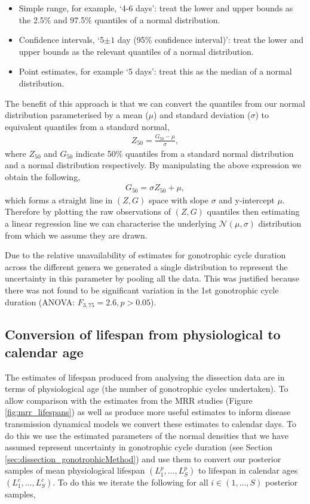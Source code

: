 \documentclass[12pt]{article}
\begin{document}
{\begin{itemize}
	\item Simple range, for example, `4-6 days': treat the lower and upper bounds as the 2.5\% and 97.5\% quantiles of a normal distribution.
	\item Confidence intervals, `5$\pm 1$ day (95\% confidence interval)': treat the lower and upper bounds as the relevant quantiles of a normal distribution.
	\item Point estimates, for example `5 days': treat this as the median of a normal distribution.
\end{itemize}

The benefit of this approach is that we can convert the quantiles from our normal distribution parameterised by a mean ($\mu$) and standard deviation ($\sigma$) to equivalent quantiles from a standard normal,
%
\begin{align}
Z_{50} = \frac{G_{50} - \mu}{\sigma},
\end{align}
%
where $Z_{50}$ and $G_{50}$ indicate 50\% quantiles from a standard normal distribution and a normal distribution respectively. By manipulating the above expression we obtain the following,
%
\begin{align}
G_{50} = \sigma Z_{50} + \mu,
\end{align}
%
which forms a straight line in $(Z,G)$ space with slope $\sigma$ and y-intercept $\mu$. Therefore by plotting the raw observations of $(Z,G)$ quantiles then estimating a linear regression line we can characterise the underlying $\mathcal{N}(\mu,\sigma)$ distribution from which we assume they are drawn.

Due to the relative unavailability of estimates for gonotrophic cycle duration across the different genera we generated a single distribution to represent the uncertainty in this parameter by pooling all the data. This was justified because there was not found to be significant variation in the 1st gonotrophic cycle duration (ANOVA: $F_{3,75}=2.6,p>0.05$).

\subsection{Conversion of lifespan from physiological to calendar age}\label{sec:dissection_conversion}
The estimates of lifespan produced from analysing the dissection data are in terms of physiological age (the number of gonotrophic cycles undertaken). To allow comparison with the estimates from the MRR studies (Figure \ref{fig:mrr_lifespans}) as well as produce more useful estimates to inform disease transmission dynamical models we convert these estimates to calendar days. To do this we use the estimated parameters of the normal densities that we have assumed represent uncertainty in gonotrophic cycle duration (see Section \ref{sec:dissection_gonotrophicMethod}) and use them to convert our posterior samples of mean physiological lifespan $(L^p_1,...,L^p_S)$ to lifespan in calendar ages $(L^c_1,...,L^c_S)$. To do this we iterate the following for all $i\in (1,...,S)$ posterior samples,

}
\end{document}
